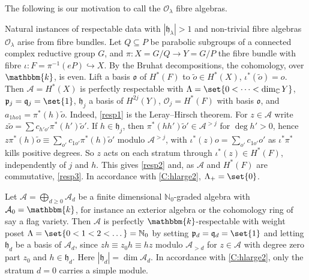 \documentclass[a4paper,11pt]{amsart}
\numberwithin{equation}{subsection}
\theoremstyle{definition}
\theoremstyle{theorem}
\theoremstyle{remark}
\newcommand\CA{\mathcal{A}}
\newcommand\CO{\mathcal{O}}
\newcommand\plam[1][\lambda]{\mathfrak{p}_{#1}}
\newcommand\hlam[1][\lambda]{\mathfrak{h}_{#1}}
\newcommand\qlam[1][\lambda]{\mathfrak{q}_{#1}}
\newcommand\Olam[1][\lambda]{\CO_{#1}}
\newcommand\N{\mathbb{N}}
\newcommand\kk{\mathbbm{k}}
\begin{document}
The following is our motivation to call the $\Olam$ fibre algebras.
\begin{Example}\label{Ex:LerayHirsch}
  Natural instances of respectable data with $|\hlam|>1$ and non-trivial fibre algebras
  $\Olam$ arise from fibre bundles. Let $Q\subseteq P$ be parabolic subgroups of a connected
  complex reductive group $G$, and $\pi\colon X=G/Q\to Y=G/P$ the fibre bundle with fibre
  $\iota\colon F=\pi^{-1}(eP)\hookrightarrow X$. By the Bruhat decompositions, the cohomology, over $\kk$,  is even. Lift a basis $\mathfrak o$ of $H^*(F)$ to $\tilde o\in H^*(X)$,
  $\iota^*(\tilde o)=o$. Then $\CA=H^*(X)$ is perfectly respectable with
  $\Lambda=\set{0<\dots<\dim_{\mathbb C}Y}$, $\plam[j]=\qlam[j]=\set{1}$, $\hlam[j]$ a basis of
  $H^{2j}(Y)$, $\Olam[j]=H^*(F)$ with basis $\mathfrak o$, and $a_{1ho1}=\pi^*(h)\tilde o$.
  Indeed, \autoref{resp1} is the Leray--Hirsch theorem. For $z\in\CA$ write
  $z\tilde o=\sum c_{h'o'}\pi^*(h')\tilde o'$. If $h\in\hlam[j]$, then $\pi^*(hh')\tilde o'\in
  \CA^{>j}$ for $\deg h'>0$, hence
  $z\pi^*(h)\tilde o\equiv\sum_{o'}c_{1o'}\pi^*(h)\tilde o'$ modulo $\CA^{>j}$, with
  $\iota^*(z)o=\sum_{o'}c_{1o'}o'$ as $\iota^*\pi^*$ kills positive degrees. So $z$ acts on each
  stratum through $\iota^*(z)\in H^*(F)$, independently of $j$ and $h$. This gives \autoref{resp2}
  and, as $\CA$ and $H^*(F)$ are commutative, \autoref{resp3}. In accordance with \autoref{C:hlarge2}, $\Lambda_+=\set{0}$.
\end{Example}


\begin{Example}\label{Ex:gradedlocal}
  Let $\CA=\bigoplus_{d\ge0}\CA_d$ be a finite dimensional $\N_0$-graded algebra with $\CA_0=\kk$, for instance an exterior algebra or the cohomology ring of say a flag variety. Then $\CA$ is perfectly $\kk$-respectable with weight poset $\Lambda=\set{0<1<2<\dots}=\N_0$ by setting  $\plam[d]=\qlam[d]=\set{1}$ and letting $\hlam[d]$ be a basis of $\CA_d$, since $zh\equiv z_0h\equiv hz$ modulo $\CA_{>d}$ for $z\in\CA$ with degree zero part $z_0$ and $h\in\hlam[d]$. Here $|\hlam[d]|=\dim\CA_d$. In accordance with \autoref{C:hlarge2}, only the stratum $d=0$ carries a simple module.
\end{Example}
\end{document}
